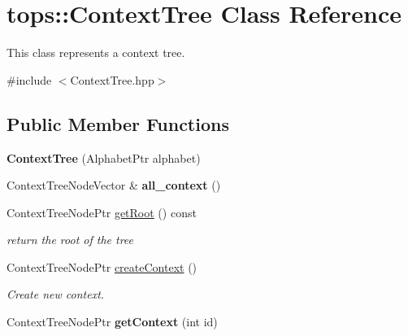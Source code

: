 \hypertarget{classtops_1_1ContextTree}{}\section{tops\+:\+:Context\+Tree Class Reference}
\label{classtops_1_1ContextTree}


This class represents a context tree.  




{\ttfamily \#include $<$Context\+Tree.\+hpp$>$}

\subsection*{Public Member Functions}
\begin{DoxyCompactItemize}
\item 
\mbox{\label{classtops_1_1ContextTree_a0743623e1668546d767b2c9d0cc00514}} 
{\bfseries Context\+Tree} (Alphabet\+Ptr alphabet)
\item 
\mbox{\label{classtops_1_1ContextTree_a0e2907f85424509d422f130e93e68d7d}} 
Context\+Tree\+Node\+Vector \& {\bfseries all\+\_\+context} ()
\item 
\mbox{\label{classtops_1_1ContextTree_a2809cc06ee322c056cdded01f2667075}} 
Context\+Tree\+Node\+Ptr \hyperlink{classtops_1_1ContextTree_a2809cc06ee322c056cdded01f2667075}{get\+Root} () const
\begin{DoxyCompactList}\small\item\em return the root of the tree \end{DoxyCompactList}\item 
\mbox{\label{classtops_1_1ContextTree_a7d255bbb69a082f3a61b012650099532}} 
Context\+Tree\+Node\+Ptr \hyperlink{classtops_1_1ContextTree_a7d255bbb69a082f3a61b012650099532}{create\+Context} ()
\begin{DoxyCompactList}\small\item\em Create new context. \end{DoxyCompactList}\item 
\mbox{\label{classtops_1_1ContextTree_a0b2d594ee72cf7e419d013c4dfee7c3d}} 
Context\+Tree\+Node\+Ptr {\bfseries get\+Context} (int id)

\end{DoxyCompactItemize}
